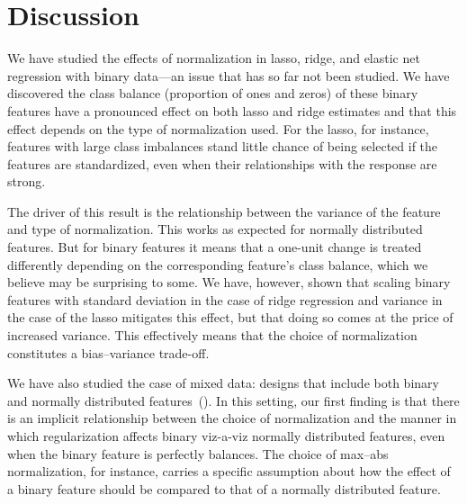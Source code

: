 \section{Discussion}%
\label{sec:discussion}

We have studied the effects of normalization in lasso, ridge, and elastic net regression
with binary data---an issue that has so far not been studied. We have discovered the class
balance (proportion of ones and zeros) of these binary features have a pronounced effect on
both lasso and ridge estimates and that this effect depends on the type of normalization
used. For the lasso, for instance, features with large class imbalances stand little chance
of being selected if the features are standardized, even when their relationships with the
response are strong.

The driver of this result is the relationship between the variance of the feature and type
of normalization. This works as expected for normally distributed features. But for binary
features it means that a one-unit change is treated differently depending on the
corresponding feature's class balance, which we believe may be surprising to some. We have,
however, shown that scaling binary features with standard deviation in the case of ridge
regression and variance in the case of the lasso mitigates this effect, but that doing so
comes at the price of increased variance. This effectively means that the choice of
normalization constitutes a bias--variance trade-off.


We have also studied the case of mixed data: designs that include both binary and normally
distributed features~(). In this setting, our first finding is that
there is an implicit relationship between the choice of normalization and the manner in
which regularization affects binary viz-a-viz normally distributed features, even when the
binary feature is perfectly balances. The choice of max--abs normalization, for instance,
carries a specific assumption about how the effect of a binary feature should be compared
to that of a normally distributed feature.

